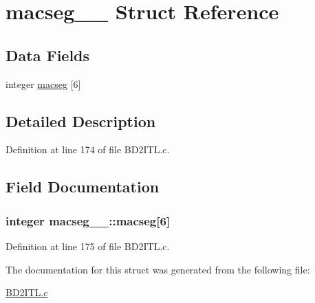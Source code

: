\hypertarget{structmacseg__1__}{}\section{macseg\+\_\+\_\+ Struct Reference}
\label{structmacseg__1__}
\subsection*{Data Fields}
\begin{DoxyCompactItemize}
\item 
integer \hyperlink{structmacseg__1___adc5dcf080226416070681918e3385696}{macseg} \mbox{[}6\mbox{]}
\end{DoxyCompactItemize}


\subsection{Detailed Description}


Definition at line 174 of file B\+D2\+I\+T\+L.\+c.



\subsection{Field Documentation}
\subsubsection[{\texorpdfstring{macseg}{macseg}}]{\setlength{\rightskip}{0pt plus 5cm}integer macseg\+\_\+\_\+\+::macseg\mbox{[}6\mbox{]}}\hypertarget{structmacseg__1___adc5dcf080226416070681918e3385696}{}\label{structmacseg__1___adc5dcf080226416070681918e3385696}


Definition at line 175 of file B\+D2\+I\+T\+L.\+c.



The documentation for this struct was generated from the following file\+:\begin{DoxyCompactItemize}
\item 
\hyperlink{BD2ITL_8c}{B\+D2\+I\+T\+L.\+c}\end{DoxyCompactItemize}
